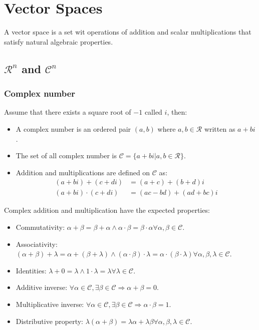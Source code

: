 \chapter{Vector Spaces}
A vector space is a set wit operations of addition and scalar multiplications that satisfy natural algebraic properties.

\section{$\mathcal{R}^n$ and $\mathcal{C}^n$}
  \subsection{Complex number}
  Assume that there exists a square root of $-1$ called $i$, then:

  \begin{multicols}{2}
    \begin{itemize}
      \item A complex number is an ordered pair $(a,b)$ where $a,b\in\mathcal{R}$ written as $a+bi$.
      \item The set of all complex number is $\mathcal{C} = \{a+bi | a,b\in\mathcal{R}\}$.
      \item Addition and multiplications are defined on $\mathcal{C}$ as:
        \begin{align*}
          (a+bi) + (c+di) &= (a+c) + (b+d)i\\
          (a+bi) \cdot (c+di) &= (ac - bd) + (ad+bc)i
        \end{align*}
    \end{itemize}
  \end{multicols}

  Complex addition and multiplication have the expected properties:

  \begin{multicols}{2}
    \begin{itemize}
      \item Commutativity: $\alpha+\beta = \beta+\alpha\land \alpha\cdot\beta=\beta\cdot\alpha\forall\alpha,\beta\in\mathcal{C}$.
      \item Associativity: $(\alpha+\beta) + \lambda = \alpha + (\beta+\lambda)\land (\alpha\cdot\beta)\cdot\lambda=\alpha\cdot(\beta\cdot\lambda)\forall\alpha,\beta,\lambda\in\mathcal{C}$.
      \item Identities: $\lambda + 0 = \lambda\land 1\cdot\lambda = \lambda\forall\lambda\in\mathcal{C}$.
      \item Additive inverse: $\forall\alpha\in\mathcal{C},\exists\beta\in\mathcal{C}\Rightarrow \alpha+\beta = 0$.
      \item Multiplicative inverse: $\forall\alpha\in\mathcal{C},\exists\beta\in\mathcal{C}\Rightarrow \alpha\cdot\beta = 1$.
      \item Distributive property: $\lambda(\alpha+\beta) = \lambda\alpha + \lambda\beta\forall\alpha,\beta,\lambda\in\mathcal{C}$.
    \end{itemize}
  \end{multicols}


